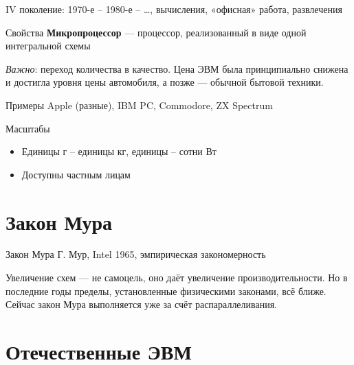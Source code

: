 \documentclass[xetex,aspectratio=43]{beamer}
\begin{document}
\begin{frame}{IV поколение: 1970-е -- 1980-е -- \ldots, вычисления, «офисная» работа, развлечения}

	\begin{block}{Свойства}
		\textbf{Микропроцессор} --- процессор, реализованный в виде одной
		интегральной схемы

		\emph{Важно}: переход количества в качество. Цена ЭВМ была принципиально
		снижена и достигла уровня цены автомобиля, а позже --- обычной бытовой
		техники.
	\end{block}

	\begin{block}{Примеры}
		Apple (разные), IBM PC, Commodore, ZX Spectrum
	\end{block}

	\begin{block}{Масштабы}
		\begin{itemize}
			\item
			Единицы г -- единицы кг, единицы -- сотни Вт
			\item
			Доступны частным лицам
		\end{itemize}
	\end{block}
\end{frame}

\section{Закон Мура}

\begin{frame}{Закон Мура}
	Г. Мур, Intel 1965, эмпирическая закономерность


	\pause

	Увеличение схем --- не самоцель, оно даёт увеличение производительности.
	Но в последние годы пределы, установленные физическими законами, всё
	ближе. Сейчас закон Мура выполняется уже за счёт распараллеливания.
\end{frame}

\section{Отечественные ЭВМ}
\end{document}
